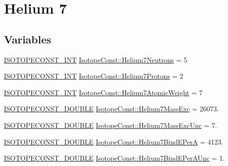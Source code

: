 \hypertarget{group___isotope_const-_helium-_he7}{}\section{Helium 7}
\label{group___isotope_const-_helium-_he7}
\subsection*{Variables}
\begin{DoxyCompactItemize}
\item 
\mbox{\hyperlink{group___isotope_const-_macros_ga5f18360b3e99483a35c32d789e62621c}{I\+S\+O\+T\+O\+P\+E\+C\+O\+N\+S\+T\+\_\+\+I\+NT}} \mbox{\hyperlink{group___isotope_const-_helium-_he7_ga7a3556a156678ef4f1524d81ce4ea847}{Isotope\+Const\+::\+Helium7\+Neutrons}} = 5
\item 
\mbox{\hyperlink{group___isotope_const-_macros_ga5f18360b3e99483a35c32d789e62621c}{I\+S\+O\+T\+O\+P\+E\+C\+O\+N\+S\+T\+\_\+\+I\+NT}} \mbox{\hyperlink{group___isotope_const-_helium-_he7_gaa3fd60bcd0606cab22354e98d26d4f34}{Isotope\+Const\+::\+Helium7\+Protons}} = 2
\item 
\mbox{\hyperlink{group___isotope_const-_macros_ga5f18360b3e99483a35c32d789e62621c}{I\+S\+O\+T\+O\+P\+E\+C\+O\+N\+S\+T\+\_\+\+I\+NT}} \mbox{\hyperlink{group___isotope_const-_helium-_he7_gabdff7e5421b2d944a9de78bdf3467e8e}{Isotope\+Const\+::\+Helium7\+Atomic\+Weight}} = 7
\item 
\mbox{\hyperlink{group___isotope_const-_macros_ga8f45a7272ce02c0b4c65c44636ed719a}{I\+S\+O\+T\+O\+P\+E\+C\+O\+N\+S\+T\+\_\+\+D\+O\+U\+B\+LE}} \mbox{\hyperlink{group___isotope_const-_helium-_he7_gafe215b54b3ff8c5d568014308974076e}{Isotope\+Const\+::\+Helium7\+Mass\+Exc}} = 26073.
\item 
\mbox{\hyperlink{group___isotope_const-_macros_ga8f45a7272ce02c0b4c65c44636ed719a}{I\+S\+O\+T\+O\+P\+E\+C\+O\+N\+S\+T\+\_\+\+D\+O\+U\+B\+LE}} \mbox{\hyperlink{group___isotope_const-_helium-_he7_ga49d3e22f46e3f444c6823da238151b26}{Isotope\+Const\+::\+Helium7\+Mass\+Exc\+Unc}} = 7.
\item 
\mbox{\hyperlink{group___isotope_const-_macros_ga8f45a7272ce02c0b4c65c44636ed719a}{I\+S\+O\+T\+O\+P\+E\+C\+O\+N\+S\+T\+\_\+\+D\+O\+U\+B\+LE}} \mbox{\hyperlink{group___isotope_const-_helium-_he7_ga24c17f71b6b04e0c11c0bbddc77638cd}{Isotope\+Const\+::\+Helium7\+Bind\+E\+PerA}} = 4123.
\item 
\mbox{\hyperlink{group___isotope_const-_macros_ga8f45a7272ce02c0b4c65c44636ed719a}{I\+S\+O\+T\+O\+P\+E\+C\+O\+N\+S\+T\+\_\+\+D\+O\+U\+B\+LE}} \mbox{\hyperlink{group___isotope_const-_helium-_he7_gaf9063f959b7a44cdc17f84de29d2660a}{Isotope\+Const\+::\+Helium7\+Bind\+E\+Per\+A\+Unc}} = 1.

\end{DoxyCompactItemize}
